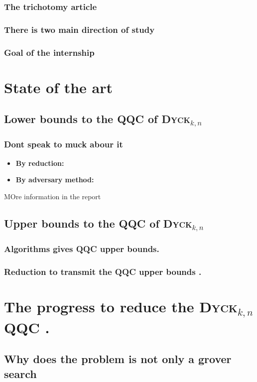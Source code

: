 \documentclass[9pt, notheorems]{beamer}
\newcommand{\Dyck}[1]{\textsc{Dyck$_{#1}$}}
\theoremstyle{definition}
\theoremstyle{plain}
\theoremstyle{definition}
\begin{document}
\begin{frame}
    \frametitle{The trichotomy article}
\end{frame}

\begin{frame}
    \frametitle{There is two main direction of study}

\end{frame}

\begin{frame}
    \frametitle{Goal of the internship}
\end{frame}

\section{State of the art}

\subsection{Lower bounds to the QQC of \Dyck{k,n}}

\begin{frame}
    \frametitle{Dont speak to muck abour it}
    \begin{itemize}
        \item \textbf{By reduction:}
        \item \textbf{By adversary method:}
    \end{itemize}
    MOre information in the report
\end{frame}

\subsection{Upper bounds to the QQC of \Dyck{k,n}}

\begin{frame}
    \frametitle{Algorithms gives QQC upper bounds.}
\end{frame}

\begin{frame}
    \frametitle{Reduction to transmit the QQC upper bounds .}

\end{frame}

\section{The progress to reduce the \Dyck{k,n} QQC .}

\subsection{Why does the problem is not only a grover search }
\end{document}
